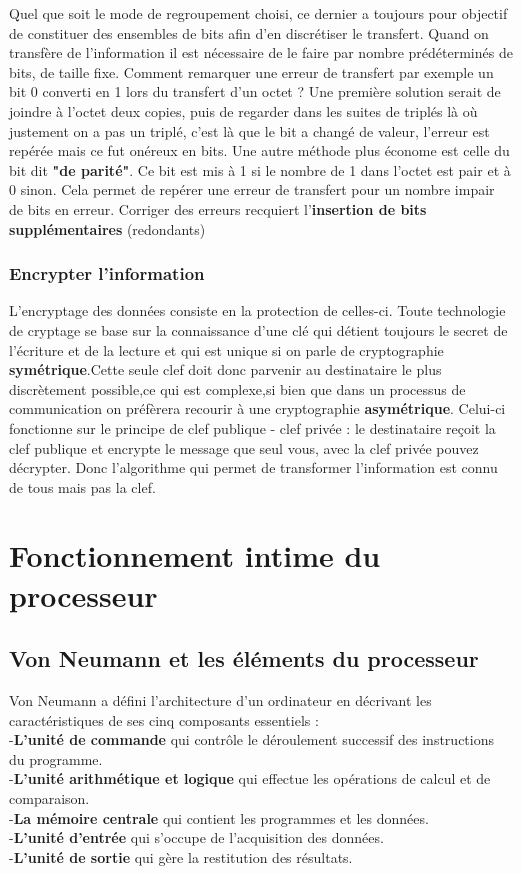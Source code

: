 \documentclass{report}
\begin{document}
Quel que soit le mode de regroupement choisi, ce dernier a toujours pour objectif de constituer des ensembles de bits afin d'en discrétiser le transfert. Quand on transfère de l'information il est nécessaire de le faire par nombre prédéterminés de bits, de taille fixe. Comment remarquer une erreur de transfert par exemple un bit 0 converti en 1 lors du transfert d'un octet ? Une première solution serait de joindre à l'octet deux copies, puis de regarder dans les suites de triplés là où justement on a pas un triplé, c'est là que le bit a changé de valeur, l'erreur est repérée mais ce fut onéreux en bits. Une autre méthode plus économe est celle du bit dit {\bf "de parité"}. Ce bit est mis à 1 si le nombre de 1 dans l'octet est pair et à 0 sinon. Cela permet de repérer une erreur de transfert pour un nombre impair de bits en erreur. 
Corriger des erreurs recquiert l'{\bf insertion de bits supplémentaires} (redondants)\\

\subsection{Encrypter l'information}
L'encryptage des données consiste en la protection de celles-ci. Toute technologie de cryptage se base sur la connaissance d'une clé qui détient toujours le secret de l'écriture et de la lecture et qui est unique si on parle de cryptographie {\bf symétrique}.Cette seule clef doit donc parvenir au destinataire le plus discrètement possible,ce qui est complexe,si bien que dans un processus de communication on préfèrera recourir à une cryptographie {\bf asymétrique}. Celui-ci fonctionne sur le principe de clef publique - clef privée : le destinataire reçoit la clef publique et encrypte le message que seul vous, avec la clef privée pouvez décrypter.
Donc l'algorithme qui permet de transformer l'information est connu de tous mais pas la clef.


\chapter{Fonctionnement intime du processeur}

\section{Von Neumann et les éléments du processeur}

Von Neumann a défini l'architecture d'un ordinateur en décrivant les caractéristiques de ses cinq composants essentiels :\\
-{\bf L'unité de commande} qui contrôle le déroulement successif des instructions du programme.\\
-{\bf L'unité arithmétique et logique} qui effectue les opérations de calcul et de comparaison.\\
-{\bf La mémoire centrale } qui contient les programmes et les données.\\
-{\bf L'unité d'entrée} qui s'occupe de l'acquisition des données.\\
-{\bf L'unité de sortie} qui gère la restitution des résultats.\\
\end{document}
